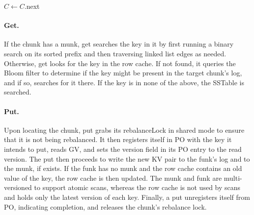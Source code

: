 \documentclass[sigplan,10pt]{acmart}
\newcommand{\code}[1]{\textsf{\fontsize{9}{11}\selectfont #1}}
\newcommand{\remove}[1]{}
\newcommand{\sys}{EvenDB}
\begin{document}
\begin{algorithm}[tb]
\begin{algorithmic}[1]{}
			\State $C \leftarrow C$.\code{next} 
		\Until{reached \code{key2}}
\EndProcedure	
\end{algorithmic}
\caption{\sys\ normal operation flow for thread \code{i}.}
\label{alg:ops}
\end{algorithm}



\paragraph{Get.}
If the chunk has a munk, {get} searches the key in it by first running a binary search on its sorted prefix and then traversing linked list edges as needed. 
Otherwise,  {get} looks for the key in the {row cache}. If not found, it queries 
the {Bloom filter} to determine if the key might be present in the target chunk's  
 {log}, and if so, searches for it there.  If the key is in none of the above, the {SSTable} is searched.

\remove{
A {put} proceeds by allocating the next free entry in 
the munk to its value by atomically fetching-and-incrementing the chunk's 
$\langle$ \code{gen}, \code{seq} $\rangle$ pair. It obtains the \code{munk} atomically with 
the read of \code{gen} in order to ensure that \code{seq} indexes the correct array. 
This can be done by re-reading  \code{gen} or by loading one object that references both.
} 

\paragraph{Put.}
Upon locating the chunk,  {put} grabs its {rebalanceLock} in shared mode to ensure that it is not being rebalanced.
It then registers itself in PO with the key it intends to put,
reads GV, and sets the version field in its PO entry to the read version. 
The {put} then proceeds to write the new KV pair to the  funk's {log} and to the 
munk, if exists. 
If the funk has no munk and the row cache contains an old value of the key, the row cache is then updated.
The munk and funk are multi-versioned to support atomic scans, 
whereas the row cache is not used by scans and holds only the latest version of each key. 
Finally, a put unregisters itself from PO, indicating completion, and releases the chunk's rebalance lock.
\end{document}

